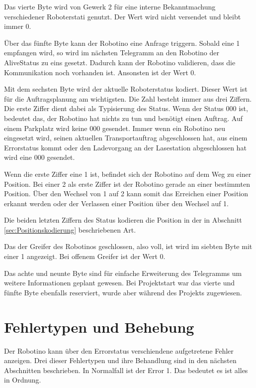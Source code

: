 Das vierte Byte wird von Gewerk 2 für eine interne Bekanntmachung verschiedener Roboterstati genutzt. Der Wert wird nicht versendet und bleibt immer 0.

Über das fünfte Byte kann der Robotino eine Anfrage triggern. Sobald eine 1 empfangen wird, so wird im nächsten Telegramm an den Robotino der AliveStatus zu eins gesetzt. Dadurch kann der Robotino validieren, dass die Kommunikation noch vorhanden ist. Ansonsten ist der Wert 0. 

Mit dem sechsten Byte wird der aktuelle Roboterstatus kodiert. Dieser Wert ist für die Auftragsplanung am wichtigsten. Die Zahl besteht immer aus drei Ziffern. Die erste Ziffer dient dabei als Typisierung des Status. Wenn der Status 000 ist, bedeutet das, der Robotino hat nichts zu tun und benötigt einen Auftrag. Auf einem Parkplatz wird keine 000 gesendet. Immer wenn ein Robotino neu eingesetzt wird, seinen aktuellen Transportauftrag abgeschlossen hat, aus einem Errorstatus kommt oder den Ladevorgang an der Lasestation abgeschlossen hat wird eine 000 gesendet. 

Wenn die erste Ziffer eine 1 ist, befindet sich der Robotino auf dem Weg zu einer Position. Bei einer 2 als erste Ziffer ist der Robotino gerade an einer bestimmten Position. Über den Wechsel von 1 auf 2 kann somit das Erreichen einer Position erkannt werden oder der Verlassen einer Position über den Wechsel auf 1. 

Die beiden letzten Ziffern des Status kodieren die Position in der in Abschnitt \ref{sec:Positionskodierung} beschriebenen Art. 

Das der Greifer des Robotinos geschlossen, also voll, ist wird im siebten Byte mit einer 1 angezeigt. Bei offenem Greifer ist der Wert 0.

Das achte und neunte Byte sind für einfache Erweiterung des Telegramms um weitere Informationen geplant gewesen. Bei Projektstart war das vierte und fünfte Byte ebenfalls reserviert, wurde aber während des Projekts zugewiesen. 

\section{Fehlertypen und Behebung}
\label{sec:Error}

Der Robotino kann über den Errorstatus verschiendene aufgetretene Fehler anzeigen. Drei dieser Fehlertypen und ihre Behandlung sind in den nächsten Abschnitten beschrieben. In Normalfall ist der Error 1. Das bedeutet es ist alles in Ordnung. 


